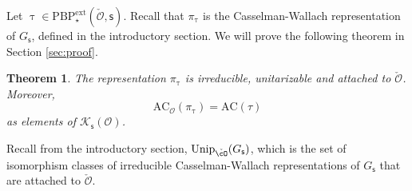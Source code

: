 \documentclass[12pt,a4paper]{amsart}
\newcommand{\CK}{{\mathcal {K}}}
\newcommand{\CO}{{\mathcal {O}}}
\numberwithin{equation}{section}
\newtheorem{thm}{Theorem}[section]
\theoremstyle{remark}
\def\Unip{\mathrm{Unip}}
\def\PBPe{\mathrm{PBP}^{\mathrm{ext}}}
\begin{document}
Let $\uptau\in \PBPe_\star(\check \CO,\mathsf s)$. Recall that $\pi_\uptau$ is the Casselman-Wallach representation of $G_{\mathsf s}$, defined in the introductory section.
We will prove the following theorem in Section \ref{sec:proof}.

\begin{thm}\label{thmpitau}
The representation $\pi_\uptau$ is irreducible, unitarizable and attached to $\check \CO$. Moreover,
\[
\mathrm{AC}_\CO(\pi_\uptau)=\mathrm{AC}(\tau)
\]
 as elements of $\CK_{\mathsf s}(\CO)$.
\end{thm}

Recall from the introductory section, $\Unip_{\check \cO}(G_\mathsf s)$, which is the set of isomorphism classes of irreducible Casselman-Wallach representations of $G_\mathsf s$ that are attached to $\check \CO$.
\end{document}
